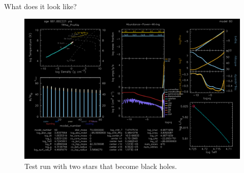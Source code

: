 \documentclass{beamer}
\begin{document}
\begin{frame}{What does it look like?}
    \begin{center}
        \begin{figure}
            \centering
            \includegraphics[width=\textwidth]{figs/double_bh}
            \caption{Test run with two stars that become black holes.}
            \label{fig:double_bh_test}
        \end{figure}
    \end{center}
\end{frame}
\end{document}
